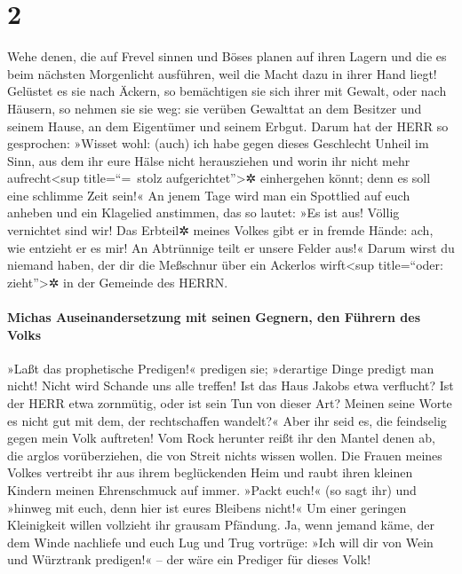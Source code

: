 \hypertarget{section-1}{%
\section{2}\label{section-1}}

 Wehe denen, die auf Frevel sinnen und Böses planen auf
ihren Lagern und die es beim nächsten Morgenlicht ausführen, weil die
Macht dazu in ihrer Hand liegt!  Gelüstet es sie nach
Äckern, so bemächtigen sie sich ihrer mit Gewalt, oder nach Häusern, so
nehmen sie sie weg: sie verüben Gewalttat an dem Besitzer und seinem
Hause, an dem Eigentümer und seinem Erbgut.  Darum hat der
HERR so gesprochen: »Wisset wohl: (auch) ich habe gegen dieses
Geschlecht Unheil im Sinn, aus dem ihr eure Hälse nicht herausziehen und
worin ihr nicht mehr aufrecht\textless sup title=``=~stolz
aufgerichtet''\textgreater✲ einhergehen könnt; denn es soll eine
schlimme Zeit sein!«  An jenem Tage wird man ein Spottlied
auf euch anheben und ein Klagelied anstimmen, das so lautet: »Es ist
aus! Völlig vernichtet sind wir! Das Erbteil✲ meines Volkes gibt er in
fremde Hände: ach, wie entzieht er es mir! An Abtrünnige teilt er unsere
Felder aus!«  Darum wirst du niemand haben, der dir die
Meßschnur über ein Ackerlos wirft\textless sup title=``oder:
zieht''\textgreater✲ in der Gemeinde des HERRN.

\hypertarget{michas-auseinandersetzung-mit-seinen-gegnern-den-fuxfchrern-des-volks}{%
\paragraph{Michas Auseinandersetzung mit seinen Gegnern, den Führern des
Volks}\label{michas-auseinandersetzung-mit-seinen-gegnern-den-fuxfchrern-des-volks}}

 »Laßt das prophetische Predigen!« predigen sie;
»derartige Dinge predigt man nicht! Nicht wird Schande uns alle treffen!
 Ist das Haus Jakobs etwa verflucht? Ist der HERR etwa
zornmütig, oder ist sein Tun von dieser Art? Meinen seine Worte es nicht
gut mit dem, der rechtschaffen wandelt?«  Aber ihr seid
es, die feindselig gegen mein Volk auftreten! Vom Rock herunter reißt
ihr den Mantel denen ab, die arglos vorüberziehen, die von Streit nichts
wissen wollen.  Die Frauen meines Volkes vertreibt ihr aus
ihrem beglückenden Heim und raubt ihren kleinen Kindern meinen
Ehrenschmuck auf immer.  »Packt euch!« (so sagt ihr) und
»hinweg mit euch, denn hier ist eures Bleibens nicht!« Um einer geringen
Kleinigkeit willen vollzieht ihr grausam Pfändung.  Ja,
wenn jemand käme, der dem Winde nachliefe und euch Lug und Trug
vortrüge: »Ich will dir von Wein und Würztrank predigen!« -- der wäre
ein Prediger für dieses Volk!

